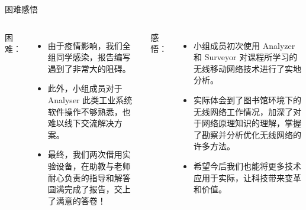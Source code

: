 \documentclass[aspectratio=169]{beamer}
\begin{document}
    \begin{frame}{困难感悟}
      \begin{columns}[onlytextwidth]
        困难：
        \begin{itemize}
          \item 由于疫情影响，我们全组同学感染，报告编写遇到了非常大的阻碍。
          \item 此外，小组成员对于 Analyser 此类工业系统软件操作不够熟悉，也难以线下交流解决方案。
          \item 最终，我们两次借用实验设备，在助教与老师耐心负责的指导和解答圆满完成了报告，交上了满意的答卷！
        \end{itemize}
        感悟：
          \begin{itemize}
            \item 小组成员初次使用 Analyzer 和 Surveyor 对课程所学习的无线移动网络技术进行了实地分析。
            \item 实际体会到了图书馆环境下的无线网络工作情况，加深了对于网络原理知识的理解，掌握了勘察并分析优化无线网络的许多方法。
            \item 希望今后我们也能将更多技术应用于实际，让科技带来变革和价值。
          \end{itemize}
      \end{columns}
    \end{frame}
\end{document}

